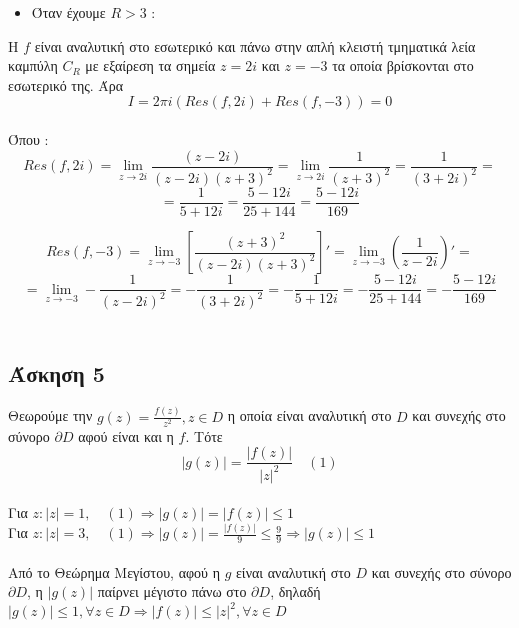 \documentclass[12pt]{article}
\begin{document}
\begin{itemize}
\item Όταν έχουμε $R>3$ :
\end{itemize}

\newline
Η $f$ είναι αναλυτική στο εσωτερικό και πάνω  στην απλή κλειστή τμηματικά λεία καμπύλη $C_{R}$ με εξαίρεση τα σημεία $z=2i$ και $ z=-3$ τα οποία βρίσκονται στο εσωτερικό της. Άρα
$$ Ι= 2 \pi i \left( Res(f,2i)+ Res(f,-3) \right)= 0 $$
\\
Όπου :
$$ Res(f,2i)= \lim_{z\to 2i} \frac{(z-2i)}{(z-2i)(z+3)^2}= \lim_{z\to 2i} \frac{1}{(z+3)^2} = \frac{1}{(3+2i)^2}= $$
$$=\frac{1}{5+12i}=\frac{5-12i}{25+144}=\frac{5-12i}{169}$$

$$ Res(f,-3)= \lim_{z\to -3} \left[ \frac{(z+3)^2}{(z-2i)(z+3)^2} \right]'= \lim_{z\to -3} \left( \frac{1}{z-2i} \right)' = $$
$$= \lim_{z\to -3} - \frac{1}{(z-2i)^2} =-\frac{1}{(3+2i)^2}=-\frac{1}{5+12i}=-\frac{5-12i}{25+144}=-\frac{5-12i}{169}$$
\\

 \subsection{Άσκηση 5}

Θεωρούμε την $ g(z)=\frac{f(z)}{z^2} ,z \in D$ η οποία είναι αναλυτική στο $D$ και συνεχής στο σύνορο $\partial D$ αφού είναι και η $ f $.
Τότε 
$$ |g(z)|=\frac{|f(z)|}{|z|^2} \quad (1) $$
\\
Για $ z:|z|=1, \quad (1)\Rightarrow |g(z)|=|f(z)|\leq 1 $\\
Για $ z:|z|=3, \quad (1)\Rightarrow |g(z)|=\frac{|f(z)|}{9}\leq \frac{9}{9}\Rightarrow |g(z)|\leq 1 $
\\ \\
Από το Θεώρημα Μεγίστου, αφού η $g$ είναι αναλυτική στο $D$ και συνεχής στο σύνορο $\partial D$, η $|g(z)|$ παίρνει μέγιστο πάνω στο $\partial D$, δηλαδή $|g(z)|\leq1,\forall z \in D \Rightarrow |f(z)|\leq |z|^2,\forall z \in D $
\end{document}

